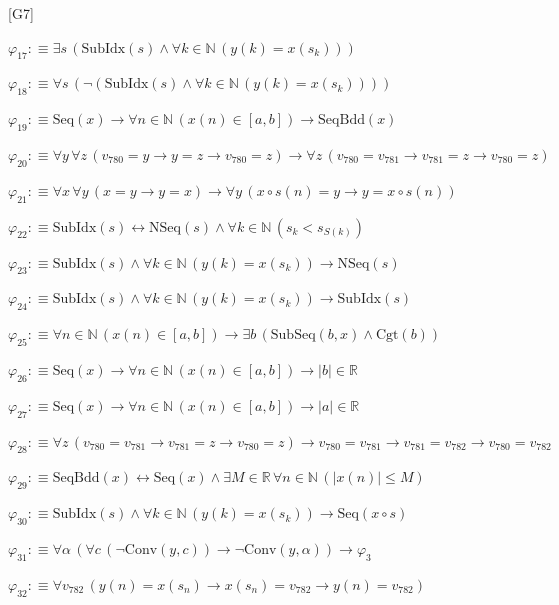 \begin{fullproof}{[G7]}
\begin{abbrevlist}
\item $\varphi_{17} :\equiv \exists s\,(\mathrm{SubIdx}(s) \land \forall k \in \mathbb{N}\,(y(k) = x(s_{k})))$
\item $\varphi_{18} :\equiv \forall s\,(\neg (\mathrm{SubIdx}(s) \land \forall k \in \mathbb{N}\,(y(k) = x(s_{k}))))$
\item $\varphi_{19} :\equiv \mathrm{Seq}(x) \to \forall n \in \mathbb{N}\,(x(n) \in [a,b]) \to \mathrm{SeqBdd}(x)$
\item $\varphi_{20} :\equiv \forall y\,\forall z\,(v_{780} = y \to y = z \to v_{780} = z) \to \forall z\,(v_{780} = v_{781} \to v_{781} = z \to v_{780} = z)$
\item $\varphi_{21} :\equiv \forall x\,\forall y\,(x = y \to y = x) \to \forall y\,(x \circ s(n) = y \to y = x \circ s(n))$
\item $\varphi_{22} :\equiv \mathrm{SubIdx}(s) \leftrightarrow \mathrm{NSeq}(s) \land \forall k \in \mathbb{N}\,(s_{k} < s_{S(k)})$
\item $\varphi_{23} :\equiv \mathrm{SubIdx}(s) \land \forall k \in \mathbb{N}\,(y(k) = x(s_{k})) \to \mathrm{NSeq}(s)$
\item $\varphi_{24} :\equiv \mathrm{SubIdx}(s) \land \forall k \in \mathbb{N}\,(y(k) = x(s_{k})) \to \mathrm{SubIdx}(s)$
\item $\varphi_{25} :\equiv \forall n \in \mathbb{N}\,(x(n) \in [a,b]) \to \exists b\,(\mathrm{SubSeq}(b,x) \land \mathrm{Cgt}(b))$
\item $\varphi_{26} :\equiv \mathrm{Seq}(x) \to \forall n \in \mathbb{N}\,(x(n) \in [a,b]) \to \lvert b \rvert \in \mathbb{R}$
\item $\varphi_{27} :\equiv \mathrm{Seq}(x) \to \forall n \in \mathbb{N}\,(x(n) \in [a,b]) \to \lvert a \rvert \in \mathbb{R}$
\item $\varphi_{28} :\equiv \forall z\,(v_{780} = v_{781} \to v_{781} = z \to v_{780} = z) \to v_{780} = v_{781} \to v_{781} = v_{782} \to v_{780} = v_{782}$
\item $\varphi_{29} :\equiv \mathrm{SeqBdd}(x) \leftrightarrow \mathrm{Seq}(x) \land \exists M \in \mathbb{R}\,\forall n \in \mathbb{N}\,(\lvert x(n) \rvert \leq M)$
\item $\varphi_{30} :\equiv \mathrm{SubIdx}(s) \land \forall k \in \mathbb{N}\,(y(k) = x(s_{k})) \to \mathrm{Seq}(x \circ s)$
\item $\varphi_{31} :\equiv \forall \alpha\,(\forall c\,(\neg \mathrm{Conv}(y,c)) \to \neg \mathrm{Conv}(y,\alpha)) \to \varphi_{3}$
\item $\varphi_{32} :\equiv \forall v_{782}\,(y(n) = x(s_{n}) \to x(s_{n}) = v_{782} \to y(n) = v_{782})$

\end{abbrevlist}
\end{fullproof}
